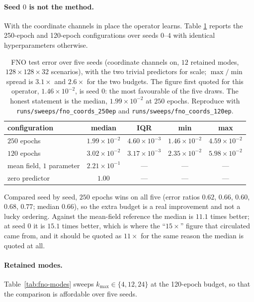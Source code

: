 \documentclass[11pt]{article}
\begin{document}
\paragraph{Seed $0$ is not the method.}
With the coordinate channels in place the operator learns. Table
\ref{tab:fno-seeds} reports the 250-epoch and 120-epoch configurations over
seeds $0$--$4$ with identical hyperparameters otherwise.

\begin{table}[h]
\centering
\begin{tabular}{lcccc}
\toprule
configuration & median & IQR & min & max \\
\midrule
$250$ epochs & $1.99\times10^{-2}$ & $4.60\times10^{-3}$ & $1.46\times10^{-2}$ & $4.59\times10^{-2}$ \\
$120$ epochs & $3.02\times10^{-2}$ & $3.17\times10^{-3}$ & $2.35\times10^{-2}$ & $5.98\times10^{-2}$ \\
mean field, $1$ parameter & $2.21\times10^{-1}$ & --- & --- & --- \\
zero predictor & $1.00$ & --- & --- & --- \\
\bottomrule
\end{tabular}
\caption{FNO test error over five seeds (coordinate channels on, $12$ retained
modes, $128\times128\times32$ scenarios), with the two trivial predictors for
scale; $\max/\min$ spread is $3.1\times$ and $2.6\times$ for the two budgets.
The figure first quoted for this operator, $1.46\times10^{-2}$, is seed $0$: the
most favourable of the five draws. The honest statement is the median,
$1.99\times10^{-2}$ at $250$ epochs. Reproduce with
\texttt{runs/sweeps/fno\_coords\_250ep} and
\texttt{runs/sweeps/fno\_coords\_120ep}.}
\label{tab:fno-seeds}
\end{table}

Compared seed by seed, $250$ epochs wins on all five (error ratios
$0.62$, $0.66$, $0.60$, $0.68$, $0.77$; median $0.66$), so the extra budget is
a real improvement and not a lucky ordering. Against the mean-field reference
the median is $11.1$ times better; at seed $0$ it is $15.1$ times better, which
is where the ``$15\times$'' figure that circulated came from, and it should be
quoted as $11\times$ for the same reason the median is quoted at all.

\paragraph{Retained modes.}
Table~\ref{tab:fno-modes} sweeps $k_{\max}\in\{4,12,24\}$ at the 120-epoch
budget, so that the comparison is affordable over five seeds.
\end{document}
